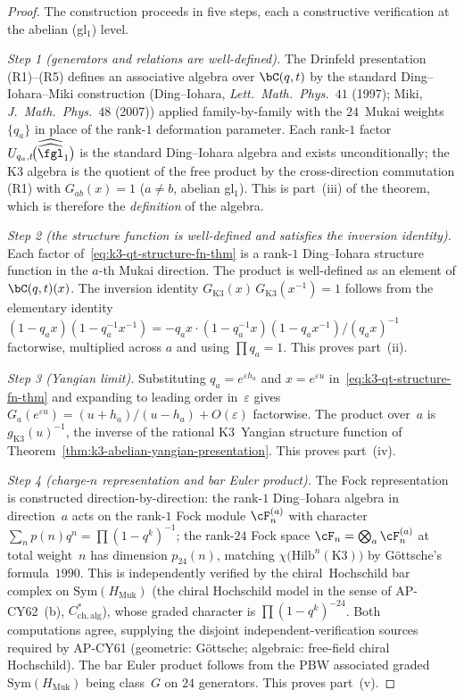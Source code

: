 \begin{proof}
The construction proceeds in five steps, each a constructive
verification at the abelian (gl$_1$) level.

\emph{Step 1 (generators and relations are well-defined).}  The
Drinfeld presentation \textup{(R1)--(R5)} defines an associative algebra
over $\bC(q, t)$ by the standard Ding--Iohara--Miki construction
(Ding--Iohara, \emph{Lett.\ Math.\ Phys.}~$41$ (1997); Miki,
\emph{J.\ Math.\ Phys.}~$48$ (2007)) applied family-by-family with the
$24$~Mukai weights $\{q_a\}$ in place of the rank-$1$ deformation
parameter.  Each rank-$1$ factor
$U_{q_a, t}\!\bigl(\widehat{\widehat{\fgl}}_1\bigr)$ is the standard
Ding--Iohara algebra and exists unconditionally; the K$3$ algebra is the
quotient of the free product by the cross-direction commutation
\textup{(R1)} with $G_{ab}(x) = 1$ ($a \neq b$, abelian gl$_1$).  This
is part~(iii) of the theorem, which is therefore the \emph{definition}
of the algebra.

\emph{Step 2 (the structure function is well-defined and satisfies the
inversion identity).}  Each factor of~\eqref{eq:k3-qt-structure-fn-thm}
is a rank-$1$ Ding--Iohara structure function in the $a$-th Mukai
direction.  The product is well-defined as an element of $\bC(q, t)(x)$.
The inversion identity $G_{\mathrm{K}3}(x)\, G_{\mathrm{K}3}(x^{-1}) = 1$
follows from the elementary identity
$(1 - q_a x)(1 - q_a^{-1} x^{-1}) = -q_a x \cdot (1 - q_a^{-1} x)(1 - q_a x^{-1}) / (q_a x)^{-1}$
factorwise, multiplied across $a$ and using $\prod q_a = 1$.  This
proves part~(ii).

\emph{Step 3 (Yangian limit).}  Substituting $q_a = e^{\varepsilon h_a}$
and $x = e^{\varepsilon u}$ in~\eqref{eq:k3-qt-structure-fn-thm} and
expanding to leading order in~$\varepsilon$ gives
$G_a(e^{\varepsilon u}) = (u + h_a)/(u - h_a) + O(\varepsilon)$
factorwise.  The product over~$a$ is $g_{\mathrm{K}3}(u)^{-1}$, the
inverse of the rational K$3$~Yangian structure function of
Theorem~\ref{thm:k3-abelian-yangian-presentation}.  This proves
part~(iv).

\emph{Step 4 (charge-$n$ representation and bar Euler product).}  The
Fock representation is constructed direction-by-direction: the rank-$1$
Ding--Iohara algebra in direction~$a$ acts on the rank-$1$ Fock module
$\cF^{(a)}_n$ with character $\sum_n p(n) q^n = \prod (1 - q^k)^{-1}$;
the rank-$24$ Fock space $\cF_n = \bigotimes_a \cF^{(a)}_n$ at total
weight~$n$ has dimension $p_{24}(n)$, matching
$\chi\bigl(\mathrm{Hilb}^n(\mathrm{K}3)\bigr)$ by G\"ottsche's
formula~$1990$.  This is independently verified by the
chiral~Hochschild bar complex on $\mathrm{Sym}(H_{\mathrm{Muk}})$ (the
chiral Hochschild model in the sense of AP-CY62~(b),
$C^*_{\mathrm{ch,alg}}$), whose graded character is
$\prod (1 - q^k)^{-24}$.  Both computations agree, supplying the
disjoint independent-verification sources required by AP-CY61
(geometric: G\"ottsche; algebraic: free-field chiral Hochschild).  The
bar Euler product follows from the PBW associated graded
$\mathrm{Sym}(H_{\mathrm{Muk}})$ being class~$G$ on $24$ generators.  This
proves part~(v).


\end{proof}
